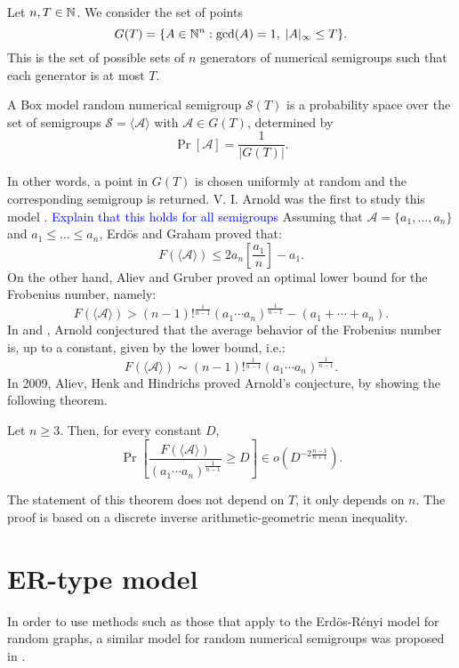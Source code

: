 Let $n, T \in \mathbb{N}$. We consider the set of points
\[G(T) = \{A\in \mathbb{N}^n : \mathrm{gcd}(A) = 1, \; |A|_\infty \leq T\}.\]
This is the set of possible sets of $n$ generators of numerical semigroups such that each generator is at most $T$. 
\begin{definition}
    A Box model random numerical semigroup $\mathcal{S}(T)$ is a probability space over the set of semigroups $\mathcal{S} = \langle\mathcal{A}\rangle$ with $\mathcal{A} \in G(T)$, determined by
    \[\Pr[ \mathcal{A}] = \frac{1}{|G(T)|}.\]
\end{definition}
In other words, a point in $G(T)$ is chosen uniformly at random and the corresponding semigroup is returned. V. I. Arnold was the first to study this model \cite{arnold1999weak}.  \textcolor{blue}{Explain that this holds for all semigroups} Assuming that $\mathcal{A} = \{a_1, \ldots, a_n\}$ and $a_1 \leq \ldots \leq a_n$, Erdös and Graham \cite{erdos1972linear} proved that: 
\[F(\langle\mathcal{A} \rangle)  \leq 2 a_n\left[\frac{a_1}{n}\right]  - a_1.\]
On the other hand, Aliev and Gruber \cite{aliev2007optimal} proved an optimal lower bound for the Frobenius number, namely:
\[F(\langle\mathcal{A} \rangle)  > (n - 1)!^{\frac{1}{n - 1}}(a_1\cdots a_n)^{\frac{1}{n - 1}} - (a_1 + \cdots + a_n).\]
In \cite{arnold1999weak} and \cite{arnold2004arnold}, Arnold conjectured that the average behavior of the Frobenius number is, up to a constant, given by the lower bound, i.e.:
\[F(\langle\mathcal{A}\rangle) \sim (n - 1)!^{\frac{1}{n - 1}}(a_1\cdots a_n)^{\frac{1}{n - 1}}.\]
In 2009, Aliev, Henk and Hindrichs \cite{aliev2011expected} proved Arnold's conjecture, by showing the following theorem. 
\begin{theorem} Let $n \geq 3$. Then, for every constant $D$,
    \[\Pr\left[\frac{F(\langle\mathcal{A}\rangle)}{(a_1\cdots a_n)^{\frac{1}{n - 1}}}\geq D\right]  \in o(D^{-2\frac{n - 1}{n + 1}}).\]
\end{theorem}
The statement of this theorem does not depend on $T$, it only depends on $n$. The proof is based on a discrete inverse arithmetic-geometric mean inequality.

\section{ER-type model}

In order to use methods such as those that apply to the Erdös-Rényi model for random graphs, a similar model for random numerical semigroups was proposed in \cite{de2018random}. 

